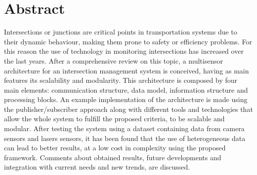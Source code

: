 \documentclass{book}
\begin{document}





%

\chapter*{Abstract}
%
Intersections or junctions are critical points in transportation systems due to their dynamic behaviour, making them prone to safety or efficiency problems. For this reason the use of technology in monitoring intersections has increased over the last years. After a comprehensive review on this topic, a  multisensor architecture for an intersection management system is conceived, having as main features its scalability and modularity. This architecture is composed by four main elements: communication structure, data model, information structure and processing blocks. An example implementation of the architecture is made using the publisher/subscriber approach along with different tools and technologies that allow the whole system to fulfill the proposed criteria, to be scalable and modular. After testing the system using a dataset containing data from camera sensors and lasers sensors, it has been found that the use of heterogeneous data can lead to better results, at a low cost in complexity using the proposed framework. Comments about  obtained results, future developments and integration with current needs and new trends, are discussed.


\end{document}
